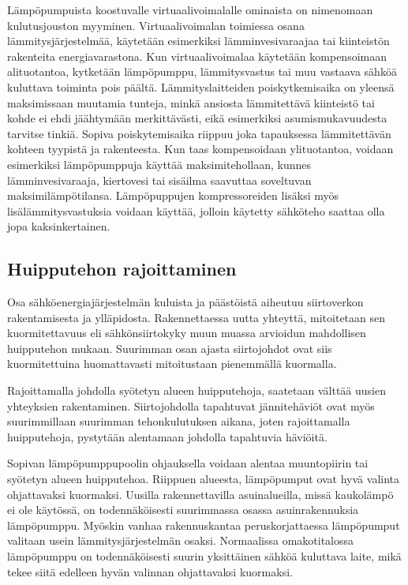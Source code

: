   Lämpöpumpuista koostuvalle virtuaalivoimalalle ominaista on nimenomaan kulutusjouston myyminen. Virtuaalivoimalan toimiessa osana lämmitysjärjestelmää, käytetään esimerkiksi lämminvesivaraajaa tai kiinteistön rakenteita energiavarastona. Kun virtuaalivoimalaa käytetään kompensoimaan alituotantoa, kytketään lämpöpumppu, lämmitysvastus tai muu vastaava sähköä kuluttava toiminta pois päältä. Lämmityslaitteiden poiskytkemisaika on yleensä maksimissaan muutamia tunteja, minkä ansiosta lämmitettävä kiinteistö tai kohde ei ehdi jäähtymään merkittävästi, eikä esimerkiksi asumismukavuudesta tarvitse tinkiä. Sopiva poiskytemisaika riippuu joka tapauksessa lämmitettävän kohteen tyypistä ja rakenteesta. Kun taas kompensoidaan ylituotantoa, voidaan esimerkiksi lämpöpumppuja käyttää maksimitehollaan, kunnes lämminvesivaraaja, kiertovesi tai sisäilma saavuttaa soveltuvan maksimilämpötilansa. Lämpöpuppujen kompressoreiden lisäksi myös lisälämmitysvastuksia voidaan käyttää, jolloin käytetty sähköteho saattaa olla jopa kaksinkertainen.

\subsection{Huipputehon rajoittaminen}

  Osa sähköenergiajärjestelmän kuluista ja päästöistä aiheutuu siirtoverkon rakentamisesta ja ylläpidosta. Rakennettaessa uutta yhteyttä, mitoitetaan sen kuormitettavuus eli sähkönsiirtokyky muun muassa arvioidun mahdollisen huipputehon mukaan. Suurimman osan ajasta siirtojohdot ovat siis kuormitettuina huomattavasti mitoitustaan pienemmällä kuormalla. \parencite{sahkoverkot}

  Rajoittamalla johdolla syötetyn alueen huipputehoja, saatetaan välttää uusien yhteyksien rakentaminen. Siirtojohdolla tapahtuvat jännitehäviöt ovat myös suurimmillaan suurimman tehonkulutuksen aikana, joten rajoittamalla huipputehoja, pystytään alentamaan johdolla tapahtuvia häviöitä.

  Sopivan lämpöpumppupoolin ohjauksella voidaan alentaa muuntopiirin tai syötetyn alueen huipputehoa. Riippuen alueesta, lämpöpumput ovat hyvä valinta ohjattavaksi kuormaksi. Uusilla rakennettavilla asuinalueilla, missä kaukolämpö ei ole käytössä, on todennäköisesti suurimmassa osassa asuinrakennuksia lämpöpumppu. Myöskin vanhaa rakennuskantaa peruskorjattaessa lämpöpumput valitaan usein lämmitysjärjestelmän osaksi. Normaalissa omakotitalossa lämpöpumppu on todennäköisesti suurin yksittäinen sähköä kuluttava laite, mikä tekee siitä edelleen hyvän valinnan ohjattavaksi kuormaksi.

